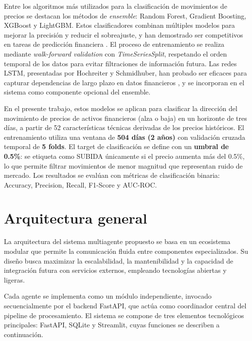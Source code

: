   Entre los algoritmos más utilizados para la clasificación de movimientos de precios
  se destacan los métodos de \textit{ensemble}: Random Forest, Gradient Boosting,
  XGBoost y LightGBM. Estos clasificadores combinan múltiples modelos para mejorar
  la precisión y reducir el sobreajuste, y han demostrado ser competitivos en tareas
  de predicción financiera \parencite{comparison2019arima}. El proceso de
  entrenamiento se realiza mediante \textit{walk-forward validation} con
  \textit{TimeSeriesSplit}, respetando el orden temporal de los datos para evitar
  filtraciones de información futura. Las redes LSTM, presentadas por Hochreiter y
  Schmidhuber, han probado ser eficaces para capturar dependencias de largo plazo en
  datos financieros \parencite{hochreiter1997long}, y se incorporan en el sistema
  como componente opcional del ensemble.

  En el presente trabajo, estos modelos se aplican para clasificar la dirección del movimiento de precios de activos financieros (alza o baja) en un horizonte de tres días, a partir de 52 características técnicas derivadas de los precios históricos. El entrenamiento utiliza una ventana de \textbf{504 días (2 años)} con validación cruzada temporal de \textbf{5 folds}. El target de clasificación se define con un \textbf{umbral de 0.5\%}: se etiqueta como SUBIDA únicamente si el precio aumenta más del 0.5\%, lo que permite filtrar movimientos de menor magnitud que representan ruido de mercado. Los resultados se evalúan con métricas de clasificación binaria: Accuracy, Precision, Recall, F1-Score y AUC-ROC.

\section{Arquitectura general}

  La arquitectura del sistema multiagente propuesto se basa en un ecosistema modular
  que permite la comunicación fluida entre componentes especializados. Su diseño busca        
  maximizar la escalabilidad, la mantenibilidad y la capacidad de integración futura
  con servicios externos, empleando tecnologías abiertas y ligeras.

  Cada agente se implementa como un módulo independiente, invocado secuencialmente
  por el backend FastAPI, que actúa como coordinador central del pipeline de
  procesamiento. El sistema se compone de tres elementos tecnológicos principales:
  FastAPI, SQLite y Streamlit, cuyas funciones se describen a continuación.

